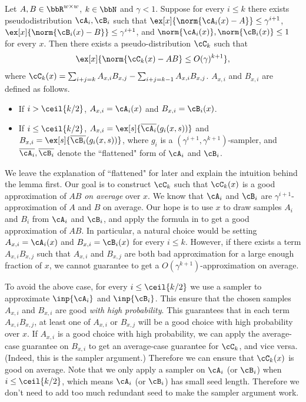 \begin{lemma}\label{lemma:main-informal}
Let $A,B\in\bbR^{w\times w}$, $k\in\bbN$ and $\gamma<1$. Suppose for every $i\le k$ there exists pseudodistribution $\cA_i,\cB_i$ such that $\ex[x]{\norm{\cA_i(x)-A}}\le \gamma^{i+1}$, $\ex[x]{\norm{\cB_i(x)-B}}\le \gamma^{i+1}$, and $\norm{\cA_i(x)},\norm{\cB_i(x)}\le 1$ for every $x$. Then there exists a pseudo-distribution $\cC_k$ such that $$\ex[x]{\norm{\cC_k(x)-AB}\le O(\gamma)^{k+1}},$$
where $\cC_k(x)=\sum_{i+j=k} A_{x,i}B_{x,j}-\sum_{i+j=k-1} A_{x,i}B_{x,j}$. $A_{x,i}$ and $B_{x,i}$ are defined as follows.
\begin{itemize}
\item 
If $i>\ceil{k/2}$, $A_{x,i}=\cA_i(x)$ and $B_{x,i}=\cB_i(x)$.
\item
If $i\le \ceil{k/2}$, $A_{x,i}=\ex[s]{\overline{\cA_i}(g_i(x,s))}$ and $B_{x,i}=\ex[s]{\overline{\cB_i}(g_i(x,s))}$, where $g_i$ is a $(\gamma^{i+1},\gamma^{k+1})$-sampler, and $\overline{\cA_i},\overline{\cB_i}$ denote the ``flattened" form of $\cA_i$ and $\cB_i$.
\end{itemize}
\end{lemma}

We leave the explanation of ``flattened" for later and explain the intuition behind the lemma first. Our goal is to construct $\cC_k$ such that $\cC_k(x)$ is a good approximation of $AB$ \emph{on average} over $x$. We  know that $\cA_i$ and $\cB_i$ are $\gamma^{i+1}$-approximation of $A$ and $B$ on average. Our hope is to use $x$ to draw samples $A_i$ and $B_i$ from $\cA_i$ and $\cB_i$, and apply the formula in  to get a good approximation of $AB$. In particular, a natural choice would be setting $A_{x,i}=\cA_i(x)$ and $B_{x,i}=\cB_i(x)$ for every $i\le k$. However, if there exists a term $A_{x,i}B_{x,j}$ such that $A_{x,i}$ and $B_{x,j}$ are both bad approximation for a large enough fraction of $x$, we cannot guarantee to get a $O(\gamma^{k+1})$-approximation on average.

To avoid the above case, for every $i\le\ceil{k/2}$ we use a sampler to approximate $\inp{\cA_i}$ and $\inp{\cB_i}$. This ensure that the chosen samples $A_{x,i}$ and $B_{x,i}$ are good \emph{with high probability}. This guarantees that in each term $A_{x,i}B_{x,j}$, at least one of $A_{x,i}$ or $B_{x,j}$ will be a good choice with high probability over $x$. If $A_{x,i}$ is a good choice with high probability, we can apply the average-case guarantee on $B_{x,i}$ to get an average-case guarantee for $\cC_k$, and vice versa. (Indeed, this is the sampler argument.) Therefore we can ensure that $\cC_k(x)$ is good on average. Note that we only apply a sampler on $\cA_i$ (or $\cB_i$) when $i\le \ceil{k/2}$, which means $\cA_i$ (or $\cB_i$) has small seed length. Therefore we don't need to add too much redundant seed to make the sampler argument work.

